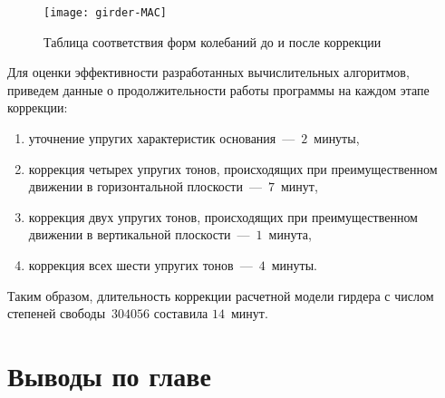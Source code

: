 \begin{figure}[!htb]
	\centering
	\texttt{[image: girder-MAC]}
	\caption{Таблица соответствия форм колебаний до и после коррекции} \label{fig:girder-MAC}
\end{figure}

Для оценки эффективности разработанных вычислительных алгоритмов, приведем данные о продолжительности работы программы на каждом этапе коррекции:
\begin{enumerate}
	\item уточнение упругих характеристик основания~---~$ 2 $~минуты,
	\item коррекция четырех упругих тонов, происходящих при преимущественном движении в горизонтальной плоскости~---~$ 7 $~минут,
	\item коррекция двух упругих тонов, происходящих при преимущественном движении в вертикальной плоскости~---~$ 1 $~минута,
	\item коррекция всех шести упругих тонов~---~$ 4 $~минуты.
\end{enumerate}

Таким образом, длительность коррекции расчетной модели гирдера с числом степеней свободы~$ 304056 $ составила $ 14 $~минут. 

\section{Выводы по главе \thechapter}

